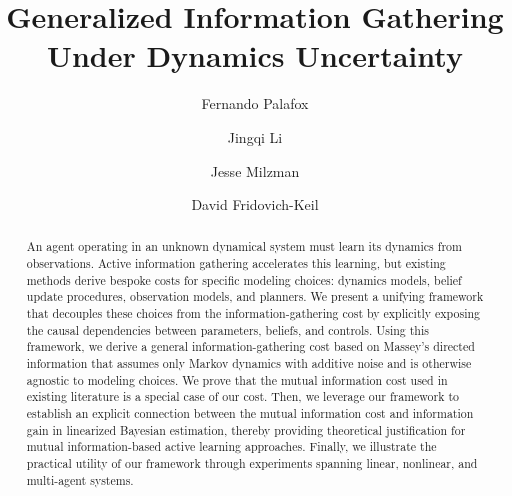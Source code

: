 \documentclass[runningheads]{llncs}
\begin{document}
%
\title{Generalized Information Gathering Under Dynamics Uncertainty}
%
%
\author{Fernando Palafox \and
Jingqi Li \and
Jesse Milzman \and
David Fridovich-Keil }
%
%
%
\maketitle              %
%


\begin{abstract}
    An agent operating in an unknown dynamical system must learn its dynamics from observations. 
    Active information gathering accelerates this learning, but existing methods derive bespoke costs for specific modeling choices: dynamics models, belief update procedures, observation models, and planners. 
    We present a unifying framework that decouples these choices from the information-gathering cost by explicitly exposing the causal dependencies between parameters, beliefs, and controls. 
    Using this framework, we derive a general information-gathering cost based on Massey's directed information \cite{massey1990causality} that assumes only Markov dynamics with additive noise and is otherwise agnostic to modeling choices. 
    We prove that the mutual information cost used in existing literature is a special case of our cost. 
    Then, we leverage our framework to establish an explicit connection between the mutual information cost and information gain in linearized Bayesian estimation, thereby providing theoretical justification for mutual information-based active learning approaches. 
    Finally, we illustrate the practical utility of our framework through experiments spanning linear, nonlinear, and multi-agent systems.
\end{abstract}
\end{document}
